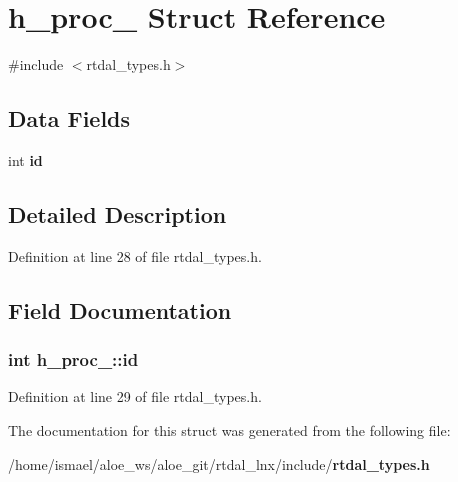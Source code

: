 \section{h\-\_\-proc\-\_\- Struct Reference}
\label{structh__proc__}


{\ttfamily \#include $<$rtdal\-\_\-types.\-h$>$}

\subsection*{Data Fields}
\begin{DoxyCompactItemize}
\item 
int {\bf id}
\end{DoxyCompactItemize}


\subsection{Detailed Description}


Definition at line 28 of file rtdal\-\_\-types.\-h.



\subsection{Field Documentation}
\subsubsection[{id}]{\setlength{\rightskip}{0pt plus 5cm}int h\-\_\-proc\-\_\-\-::id}\label{structh__proc___a99d85862e419acc6daa4e5c5afa1b5d4}


Definition at line 29 of file rtdal\-\_\-types.\-h.



The documentation for this struct was generated from the following file\-:\begin{DoxyCompactItemize}
\item 
/home/ismael/aloe\-\_\-ws/aloe\-\_\-git/rtdal\-\_\-lnx/include/{\bf rtdal\-\_\-types.\-h}\end{DoxyCompactItemize}
